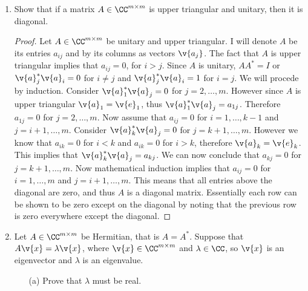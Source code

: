 \documentclass[11pt]{article}
\begin{document}
\begin{enumerate}
\begin{enumerate}
        \end{enumerate}

    \item %
        Show that if a matrix $A \in \CC^{m \times m}$ is upper triangular and
        unitary, then it is diagonal.

        \begin{proof}
            Let $A \in \CC^{m \times m}$ be unitary and upper triangular.
            I will denote $A$ be its entries $a_{ij}$ and by its columns as
            vectors $\v{a_j}$.
            The fact that $A$ is upper triangular implies that $a_{ij} = 0$,
            for $i > j$.
            Since $A$ is unitary, $AA^* = I$ or $\v{a}_j^*\v{a}_i = 0$ for
            $i \neq j$ and $\v{a}_j^*\v{a}_i = 1$ for $i = j$.
            We will procede by induction. 
            Consider $\v{a}_1^*\v{a}_j = 0$ for $j = 2, \ldots, m$.
            However since $A$ is upper triangular $\v{a}_1 = \v{e}_1$, thus
            $\v{a}_1^*\v{a}_j = a_{1j}$.
            Therefore $a_{1j} = 0$ for $j = 2, \ldots, m$.
            Now assume that $a_{ij} = 0$ for $i = 1, \ldots, k - 1$ and
            $j = i + 1, \ldots, m$.
            Consider $\v{a}_k^* \v{a}_j = 0$ for $j = k+1, \ldots, m$.
            However we know that $a_{ik} = 0$ for $i < k$ and $a_{ik} = 0$ for
            $i > k$, therefore $\v{a}_k = \v{e}_k$.
            This implies that $\v{a}_k^* \v{a}_j = a_{kj}$.
            We can now conclude that $a_{kj} = 0$ for $j = k+1, \ldots, m$.
            Now mathematical induction implies that $a_{ij} = 0$ for
            $i = 1, \ldots, m$ and $j = i+1, \ldots, m$.
            This means that all entries above the diagonal are zero, and thus
            $A$ is a diagonal matrix.
            Essentially each row can be shown to be zero except on the diagonal
            by noting that the previous row is zero everywhere except the
            diagonal.
        \end{proof}

    \item %
        Let $A \in \CC^{m \times m}$ be Hermitian, that is $A = A^*$.
        Suppose that $A\v{x} = \lambda\v{x}$, where $\v{x} \in \CC^{m \times m}$
        and $\lambda \in \CC$, so $\v{x}$ is an eigenvector and $\lambda$ is an
        eigenvalue.
        \begin{enumerate}
            \item[(a)]
                Prove that $\lambda$ must be real.


\end{enumerate}
\end{enumerate}
\end{document}
